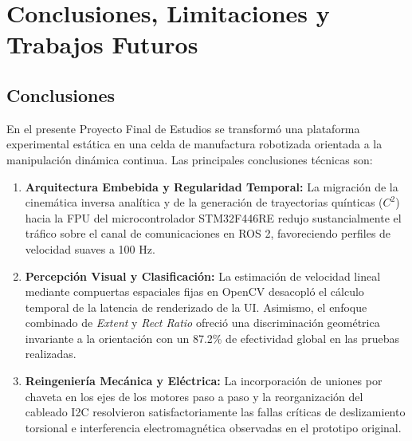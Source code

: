 \documentclass[12pt, a4paper]{report}
\begin{document}
\chapter{Conclusiones, Limitaciones y Trabajos Futuros}

\section{Conclusiones}
En el presente Proyecto Final de Estudios se transformó una plataforma experimental estática en una celda de manufactura robotizada orientada a la manipulación dinámica continua. Las principales conclusiones técnicas son:
\begin{enumerate}
    \item \textbf{Arquitectura Embebida y Regularidad Temporal:} La migración de la cinemática inversa analítica y de la generación de trayectorias quínticas ($C^2$) hacia la FPU del microcontrolador STM32F446RE redujo sustancialmente el tráfico sobre el canal de comunicaciones en ROS 2, favoreciendo perfiles de velocidad suaves a 100 Hz.
    \item \textbf{Percepción Visual y Clasificación:} La estimación de velocidad lineal mediante compuertas espaciales fijas en OpenCV desacopló el cálculo temporal de la latencia de renderizado de la UI. Asimismo, el enfoque combinado de \textit{Extent} y \textit{Rect Ratio} ofreció una discriminación geométrica invariante a la orientación con un 87.2\% de efectividad global en las pruebas realizadas.
    \item \textbf{Reingeniería Mecánica y Eléctrica:} La incorporación de uniones por chaveta en los ejes de los motores paso a paso y la reorganización del cableado I2C resolvieron satisfactoriamente las fallas críticas de deslizamiento torsional e interferencia electromagnética observadas en el prototipo original.
\end{enumerate}
\end{document}
